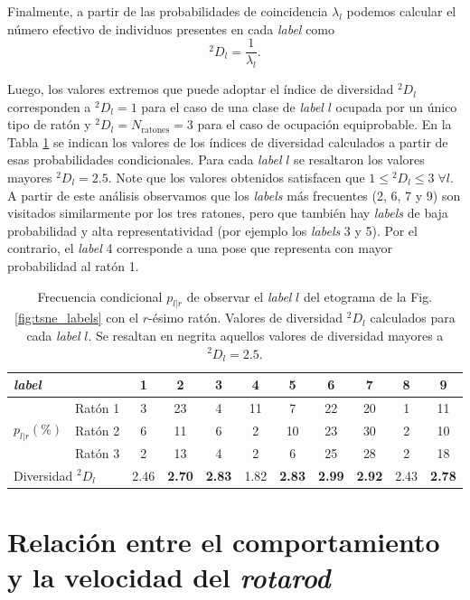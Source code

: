 Finalmente, a partir de las probabilidades de coincidencia $\lambda_l$ podemos calcular el número efectivo de individuos presentes en cada \textit{label} como
\begin{equation}
    {}^{2}D_l = \frac{1}{\lambda_l}.
\end{equation}

Luego, los valores extremos que puede adoptar el índice de diversidad ${}^{2}D_l$ corresponden a ${}^{2}D_l = 1$ para el caso de una clase de \textit{label} $l$ ocupada por un único tipo de ratón y ${}^{2}D_l = N_{\mathrm{ratones}} = 3$ para el caso de ocupación equiprobable. En la Tabla \ref{tab:diversidad} se indican los valores de los índices de diversidad calculados a partir de esas probabilidades condicionales. Para cada \textit{label} $l$ se resaltaron los valores mayores ${}^{2}D_l = 2.5$. Note que los valores obtenidos satisfacen que $1 \leq {}^{2}D_l \leq 3 \; \forall l$. A partir de este análisis observamos que los \textit{labels} más frecuentes (2, 6, 7 y 9) son visitados similarmente por los tres ratones, pero que también hay \textit{labels} de baja probabilidad y alta representatividad (por ejemplo los \textit{labels} 3 y 5). Por el contrario, el \textit{label} 4 corresponde a una pose que representa con mayor probabilidad al ratón 1.  

\begin{table}[!htbp]
\begin{tabular}{ll|ccccccccc}
\multicolumn{2}{l|}{\textit{label}} & 1 & 2 & 3 & 4 & 5 & 6 & 7 & 8 & 9 \\ \hline
\multirow{3}{*}{$p_{l|r}(\%)$}
& Ratón 1 & 3 & 23 & 4 & 11 & 7 & 22 & 20 & 1 & 11 \\
& Ratón 2 & 6 & 11 & 6 & 2 & 10 & 23 & 30 & 2 & 10 \\
& Ratón 3 & 2 & 13 & 4 & 2 & 6 & 25 & 28 & 2 & 18 \\
\multicolumn{2}{l|}{Diversidad ${}^{2}D_l$}
& 2.46 & \textbf{2.70} & \textbf{2.83} & 1.82 & \textbf{2.83} & \textbf{2.99} & \textbf{2.92} & 2.43 & \textbf{2.78}
\end{tabular}
\caption{Frecuencia condicional $p_{l|r}$ de observar el \textit{label} $l$ del etograma de la Fig. \ref{fig:tsne_labels} con el $r$-ésimo ratón. Valores de diversidad ${}^{2}D_l$ calculados para cada \textit{label} $l$. Se resaltan en negrita aquellos valores de diversidad mayores a ${}^{2}D_l = 2.5$.}
\label{tab:diversidad}
\end{table}

\section{Relación entre el comportamiento y la velocidad del \textit{rotarod}}\label{sec:vel_rotarod}

